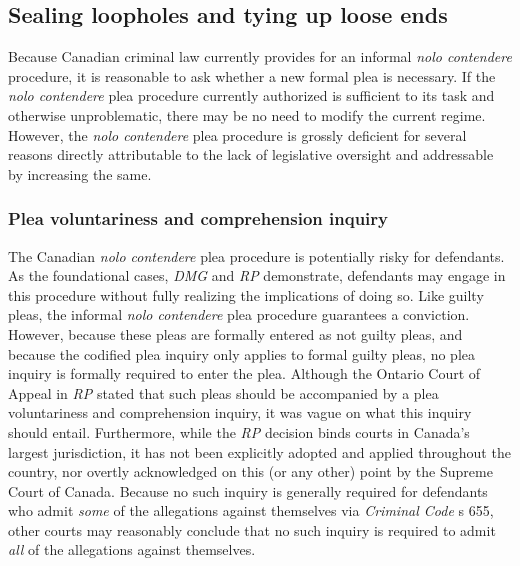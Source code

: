 \subsection{Sealing loopholes and tying up loose ends}

Because Canadian criminal law currently provides for an informal \textit{nolo contendere} procedure, it is reasonable to ask whether a new formal plea is necessary. If the \textit{nolo contendere} plea procedure currently authorized is sufficient to its task and otherwise unproblematic, there may be no need to modify the current regime. However, the \textit{nolo contendere} plea procedure is grossly deficient for several reasons directly attributable to the lack of legislative oversight and addressable by increasing the same.

\subsubsection{Plea voluntariness and comprehension inquiry}

The Canadian \textit{nolo contendere} plea procedure is potentially risky for defendants. As the foundational cases, \textit{DMG} and \textit{RP} demonstrate, defendants may engage in this procedure without fully realizing the implications of doing so. Like guilty pleas, the informal \textit{nolo contendere} plea procedure guarantees a conviction. However, because these pleas are formally entered as not guilty pleas, and because the codified plea inquiry only applies to formal guilty pleas, no plea inquiry is formally required to enter the plea. Although the Ontario Court of Appeal in \textit{RP} stated that such pleas should be accompanied by a plea voluntariness and comprehension inquiry, it was vague on what this inquiry should entail. Furthermore, while the \textit{RP} decision binds courts in Canada's largest jurisdiction, it has not been explicitly adopted and applied throughout the country, nor overtly acknowledged on this (or any other) point by the Supreme Court of Canada. Because no such inquiry is generally required for defendants who admit \textit{some} of the allegations against themselves via \textit{Criminal Code} s 655, other courts may reasonably conclude that no such inquiry is required to admit \textit{all} of the allegations against themselves. 

